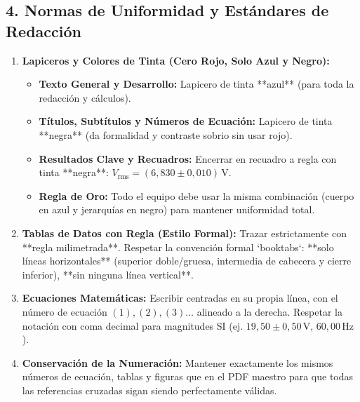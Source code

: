 \documentclass[a4paper, 10pt]{article}
\begin{document}
\vspace{0.1cm}

\subsection*{\color{uni-blue}4. Normas de Uniformidad y Estándares de Redacción}

\begin{enumerate}[leftmargin=1.8em, itemsep=2.5pt]
    \item \textbf{Lapiceros y Colores de Tinta (Cero Rojo, Solo Azul y Negro):}
    \begin{itemize}[leftmargin=1.2em, itemsep=1pt]
        \item \textbf{Texto General y Desarrollo:} Lapicero de tinta **azul** (para toda la redacción y cálculos).
        \item \textbf{Títulos, Subtítulos y Números de Ecuación:} Lapicero de tinta **negra** (da formalidad y contraste sobrio sin usar rojo).
        \item \textbf{Resultados Clave y Recuadros:} Encerrar en recuadro a regla con tinta **negra**: $\boxed{V_{\text{rms}} = (6{,}830 \pm 0{,}010)\,\text{V}}$.
        \item \textbf{Regla de Oro:} Todo el equipo debe usar la misma combinación (cuerpo en azul y jerarquías en negro) para mantener uniformidad total.
    \end{itemize}
    \item \textbf{Tablas de Datos con Regla (Estilo Formal):} Trazar estrictamente con **regla milimetrada**. Respetar la convención formal `booktabs`: **solo líneas horizontales** (superior doble/gruesa, intermedia de cabecera y cierre inferior), **sin ninguna línea vertical**.
    \item \textbf{Ecuaciones Matemáticas:} Escribir centradas en su propia línea, con el número de ecuación $(1), (2), (3)\dots$ alineado a la derecha. Respetar la notación con coma decimal para magnitudes SI (ej. $19{,}50\pm 0{,}50\,\text{V}$, $60{,}00\,\text{Hz}$).
    \item \textbf{Conservación de la Numeración:} Mantener exactamente los mismos números de ecuación, tablas y figuras que en el PDF maestro para que todas las referencias cruzadas sigan siendo perfectamente válidas.
\end{enumerate}
\end{document}
